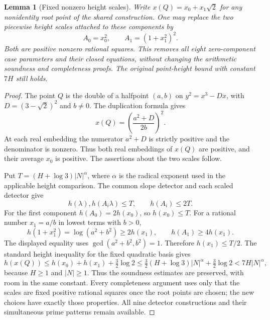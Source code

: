 \documentclass[11pt]{article}
\newtheorem{lemma}[theorem]{Lemma}
\theoremstyle{definition}
\begin{document}
\begin{lemma}[Fixed nonzero height scales]
\label{lem:fixed-height-scales}
Write $x(Q)=x_0+x_1\sqrt2$ for any nonidentity root point of the
shared construction.  One may replace the two piecewise height
scales attached to these components by
\[
                         A_0=x_0^2,
              \qquad A_1=(1+x_1^2)^2.
\]
Both are positive nonzero rational squares.  This removes all
eight zero-component case parameters and their closed equations,
without changing the arithmetic soundness and completeness proofs.
The original point-height bound with constant $7H$ still holds.
\end{lemma}
\begin{proof}
The point $Q$ is the double of a halfpoint $(a,b)$ on
$y^2=x^3-Dx$, with $D=(3-\sqrt2)^2$ and $b\ne0$.
The duplication formula gives
\[
                   x(Q)=\left(\frac{a^2+D}{2b}\right)^2.
\]
At each real embedding the numerator $a^2+D$ is strictly positive
and the denominator is nonzero.  Thus both real embeddings of
$x(Q)$ are positive, and their average $x_0$ is positive.
The assertions about the two scales follow.

Put $T=(H+\log3)|N|^\alpha$, where $\alpha$ is the radical
exponent used in the applicable height comparison.  The common
slope detector and each scaled detector give
\[
               h(\lambda),h(A_i\lambda)\le T,
               \qquad h(A_i)\le2T.
\]
For the first component $h(A_0)=2h(x_0)$, so $h(x_0)\le T$.
For a rational number $x_1=a/b$ in lowest terms with $b>0$,
\[
 h(1+x_1^2)=\log(a^2+b^2)\ge2h(x_1),
 \qquad h(A_1)\ge4h(x_1).
\]
The displayed equality uses
$\gcd(a^2+b^2,b^2)=1$.  Therefore $h(x_1)\le T/2$.  The
standard height inequality for the fixed quadratic basis gives
\[
 h(x(Q))\le h(x_0)+h(x_1)+\tfrac32\log2
 \le\tfrac32(H+\log3)|N|^\alpha+\tfrac32\log2
 <7H|N|^\alpha,
\]
because $H\ge1$ and $|N|\ge1$.  Thus the soundness estimates are
preserved, with room in the same constant.  Every completeness
argument uses only that the scales are fixed positive rational
squares once the root points are chosen; the new choices have
exactly those properties.  All nine detector constructions and
their simultaneous prime patterns remain available.
\end{proof}
\end{document}
